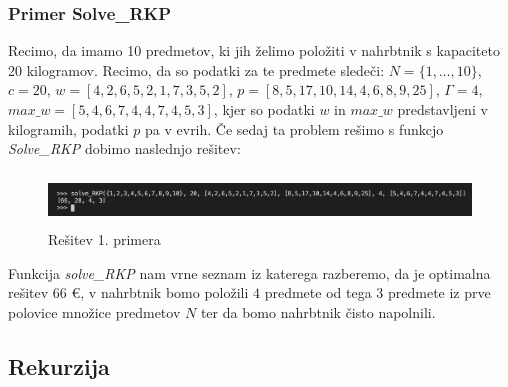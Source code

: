 \documentclass[a4paper,12pt]{article}
\theoremstyle{definition}
\begin{document}
\subsubsection{Primer Solve\_RKP}

Recimo, da imamo 10 predmetov, ki jih želimo položiti v nahrbtnik s kapaciteto 20 kilogramov. Recimo, da so podatki za te predmete sledeči: 
$N = \{1, \dots, 10\}$, $c = 20$, $w = [4, 2, 6, 5, 2, 1, 7, 3, 5, 2]$, $p = [8, 5, 17, 10, 14, 4, 6, 8, 9, 25]$, $\Gamma = 4$, 
$max\_w = [5, 4, 6, 7, 4, 4, 7, 4, 5, 3]$, kjer so podatki $w$ in $max\_w$ predstavljeni v kilogramih, podatki $p$ pa v evrih. Če sedaj ta problem 
rešimo s funkcjo \textit{Solve\_RKP} dobimo naslednjo rešitev:

\begin{figure}[h]
    \includegraphics[width=14cm, height = 1.4cm]{primer1.png}
    \caption{Rešitev 1. primera}
    \label{fig:koda3}    
\end{figure}

\noindent Funkcija \textit{solve\_RKP} nam vrne seznam iz katerega razberemo, da je optimalna rešitev 66
 \euro, v nahrbtnik bomo položili $4$ predmete od tega $3$ predmete iz prve polovice množice predmetov $N$ ter da bomo nahrbtnik čisto napolnili.


\subsection{Rekurzija}
\medskip
\end{document}
